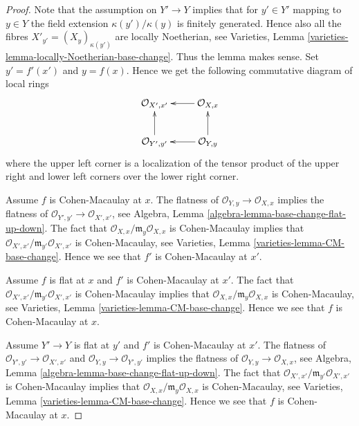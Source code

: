 \documentclass[10pt,a4paper]{amsart}
\theoremstyle{plain}
\theoremstyle{definition}
\theoremstyle{remark}
\numberwithin{equation}{subsection}
\begin{document}
\begin{proof}
Note that the assumption on $Y' \to Y$ implies that for $y' \in Y'$
mapping to $y \in Y$ the field extension $\kappa(y')/\kappa(y)$
is finitely generated. Hence also all the fibres
$X'_{y'} = (X_y)_{\kappa(y')}$ are locally Noetherian, see
Varieties, Lemma \ref{varieties-lemma-locally-Noetherian-base-change}.
Thus the lemma makes sense. Set $y' = f'(x')$ and $y = f(x)$.
Hence we get the following commutative diagram of local rings
$$
\xymatrix{
\mathcal{O}_{X', x'} & \mathcal{O}_{X, x} \ar[l] \\
\mathcal{O}_{Y', y'} \ar[u] & \mathcal{O}_{Y, y} \ar[l] \ar[u]
}
$$
where the upper left corner is a localization of the tensor product
of the upper right and lower left corners over the lower right corner.

\medskip\noindent
Assume $f$ is Cohen-Macaulay at $x$.
The flatness of $\mathcal{O}_{Y, y} \to \mathcal{O}_{X, x}$
implies the flatness of $\mathcal{O}_{Y', y'} \to \mathcal{O}_{X', x'}$, see
Algebra, Lemma \ref{algebra-lemma-base-change-flat-up-down}.
The fact that $\mathcal{O}_{X, x}/\mathfrak m_y\mathcal{O}_{X, x}$
is Cohen-Macaulay implies that
$\mathcal{O}_{X', x'}/\mathfrak m_{y'}\mathcal{O}_{X', x'}$
is Cohen-Macaulay, see
Varieties, Lemma \ref{varieties-lemma-CM-base-change}. Hence we see that $f'$
is Cohen-Macaulay at $x'$.

\medskip\noindent
Assume $f$ is flat at $x$ and $f'$ is Cohen-Macaulay at $x'$.
The fact that $\mathcal{O}_{X', x'}/\mathfrak m_{y'}\mathcal{O}_{X', x'}$
is Cohen-Macaulay implies that
$\mathcal{O}_{X, x}/\mathfrak m_y\mathcal{O}_{X, x}$
is Cohen-Macaulay, see
Varieties, Lemma \ref{varieties-lemma-CM-base-change}.
Hence we see that $f$ is Cohen-Macaulay at $x$.

\medskip\noindent
Assume $Y' \to Y$ is flat at $y'$ and $f'$ is Cohen-Macaulay at
$x'$. The flatness of $\mathcal{O}_{Y', y'} \to \mathcal{O}_{X', x'}$
and $\mathcal{O}_{Y, y} \to \mathcal{O}_{Y', y'}$ implies the flatness
of $\mathcal{O}_{Y, y} \to \mathcal{O}_{X, x}$, see
Algebra, Lemma \ref{algebra-lemma-base-change-flat-up-down}.
The fact that $\mathcal{O}_{X', x'}/\mathfrak m_{y'}\mathcal{O}_{X', x'}$
is Cohen-Macaulay implies that
$\mathcal{O}_{X, x}/\mathfrak m_y\mathcal{O}_{X, x}$
is Cohen-Macaulay, see
Varieties, Lemma \ref{varieties-lemma-CM-base-change}. Hence we see that $f$
is Cohen-Macaulay at $x$.
\end{proof}
\end{document}
